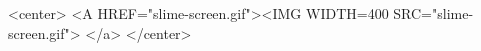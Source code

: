 


\begin{rawhtml}
  <center>
  <A HREF="slime-screen.gif"><IMG  WIDTH=400 SRC="slime-screen.gif"> </a>
  </center>
\end{rawhtml}

